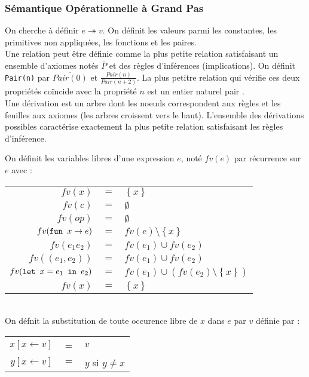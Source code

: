 \documentclass{cours}
\begin{document}
\subsubsection{Sémantique Opérationnelle à Grand Pas}
On cherche à définir $e \twoheadrightarrow v$. On définit les valeurs parmi les constantes, les primitives non appliquées, les fonctions et les paires. \\
Une relation peut être définie comme la plus petite relation satisfaisant un ensemble d'axiomes notés $\overline{P}$ et des règles d'inférences (implications). On définit \texttt{Pair(n)} par $\overline{Pair(0)}$ et $\frac{Pair(n)}{Pair(n+2)}$. La plus petitre relation qui vérifie ces deux propriétés coïncide avec la propriété \og $n$ est un entier naturel pair \fg.\\
Une dérivation est un arbre dont les noeuds correspondent aux règles et les feuilles aux axiomes (les arbres croissent vers le haut). L'ensemble des dérivations possibles caractérise exactement la plus petite relation satisfaisant les règles d'inférence. \\
\begin{definition}
    On définit les variables libres d'une expression $e$, noté $fv(e)$ par récurrence sur $e$ avec :
    \begin{tabular}{rcl}
        $fv(x)$ &$=$&$\left\{x\right\}$\\
        $fv(c)$ &$=$&$\emptyset$\\
        $fv(op)$ &$=$&$\emptyset$\\
        $fv(\texttt{fun } x \rightarrow e)$ &$=$&$fv(e) \setminus \left\{x\right\}$\\
        $fv(e_{1} e_{2})$ &$=$&$fv(e_{1}) \cup fv(e_{2})$\\
        $fv((e_{1}, e_{2}))$ &$=$&$fv(e_{1}) \cup fv(e_{2})$\\
        $fv(\texttt{let } x = e_{1} \texttt{ in } e_{2})$ &$=$&$fv(e_{1}) \cup \left(fv(e_{2})\setminus \left\{x\right\}\right)$\\
        $fv(x)$ &$=$&$\left\{x\right\}$\\        
    \end{tabular}\\
    On défnit la substitution  de toute occurence libre de $x$ dans $e$ par $v$ définie par : 
    \begin{tabular}{rcl}
        $x[x\leftarrow v]$ &=& $v$\\
        $y[x \leftarrow v]$ &$=$& $y$ si $y\neq x$
    \end{tabular}
\end{definition}
\end{document}
